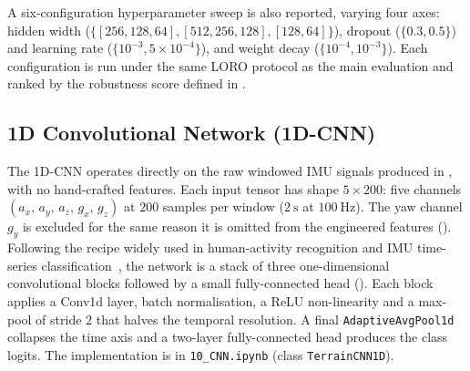 A six-configuration hyperparameter sweep is also reported, varying four axes: hidden width ($\{[256,128,64], [512,256,128], [128,64]\}$), dropout ($\{0.3, 0.5\}$) and learning rate ($\{10^{-3},\allowbreak 5\!\times\!10^{-4}\}$), and weight decay ($\{10^{-4}, 10^{-3}\}$). Each configuration is run under the same LORO protocol as the main evaluation and ranked by the robustness score defined in .

\subsection{1D Convolutional Network (1D-CNN)}

The 1D-CNN operates directly on the raw windowed IMU signals produced in , with no hand-crafted features. Each input tensor has shape $5 \times 200$: five channels $(a_x,\,a_y,\,a_z,\,g_x,\,g_z)$ at $200$ samples per window ($\SI{2}{\second}$ at $\SI{100}{\hertz}$). The yaw channel $g_y$ is excluded for the same reason it is omitted from the engineered features (). Following the recipe widely used in human-activity recognition and IMU time-series classification~\cite{Wang2017,Fawaz2019}, the network is a stack of three one-dimensional convolutional blocks followed by a small fully-connected head (). Each block applies a Conv1d layer, batch normalisation, a ReLU non-linearity and a max-pool of stride $2$ that halves the temporal resolution. A final \texttt{AdaptiveAvgPool1d} collapses the time axis and a two-layer fully-connected head produces the class logits. The implementation is in \texttt{10\_CNN.ipynb} (class \texttt{TerrainCNN1D}).

\begin{table}[H]
\centering
\label{tab:cnn_arch}
\caption{1D-CNN architecture. \texttt{T} denotes the temporal length, which halves after each MaxPool stage; \texttt{C} $\in \{3, 5\}$ is the number of output classes depending on the dataset.}
\end{table}

